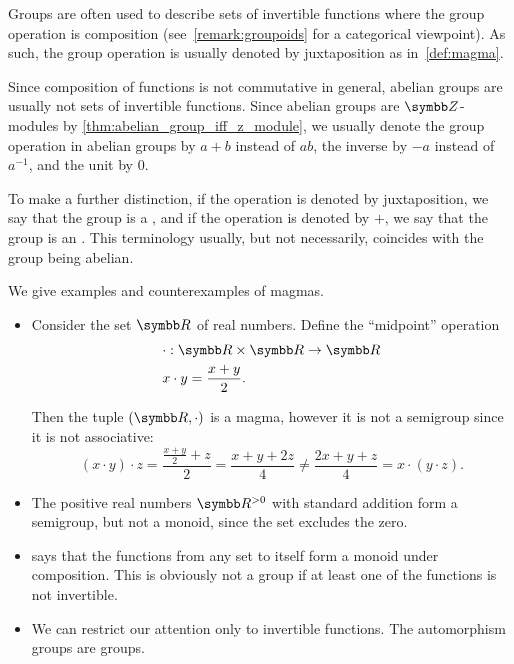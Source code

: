 \begin{remark}\label{remark:additive_group}
  Groups are often used to describe sets of invertible functions where the group operation is composition (see~\cref{remark:groupoids} for a categorical viewpoint). As such, the group operation is usually denoted by juxtaposition as in~\cref{def:magma}.

  Since composition of functions is not commutative in general, abelian groups are usually not sets of invertible functions. Since abelian groups are \( \Z \)-modules by \cref{thm:abelian_group_iff_z_module}, we usually denote the group operation in abelian groups by \( a + b \) instead of \( ab \), the inverse by \( -a \) instead of \( a^{-1} \), and the unit by \( 0 \).

  To make a further distinction, if the operation is denoted by juxtaposition, we say that the group is a , and if the operation is denoted by \( + \), we say that the group is an . This terminology usually, but not necessarily, coincides with the group being abelian.
\end{remark}

\begin{example}\label{ex:magmas}
  We give examples and counterexamples of magmas.

  \begin{itemize}
    \item Consider the set \( \R \) of real numbers. Define the \enquote{midpoint} operation
    \begin{align*}
      &\cdot: \R \times \R \to \R \\
      &x \cdot y = \frac {x + y} 2.
    \end{align*}

    Then the tuple \( (\R, \cdot) \) is a magma, however it is not a semigroup since it is not associative:
    \begin{equation*}
      (x \cdot y) \cdot z = \frac {{\frac {x + y} 2} + z} 2 = \frac {x + y + 2z} 4
      \neq
      \frac {2x + y + z} 4 = x \cdot (y \cdot z).
    \end{equation*}

    \item The positive real numbers \( \R^{>0} \) with standard addition form a semigroup, but not a monoid, since the set excludes the zero.

    \item {} says that the functions from any set to itself form a monoid under composition. This is obviously not a group if at least one of the functions is not invertible.

    \item We can restrict our attention only to invertible functions. The automorphism groups are groups.
  \end{itemize}
\end{example}

